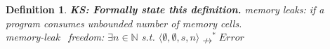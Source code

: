 \documentclass[english]{jssst_ppl} %
\newcommand\LET{\mathbf{let}\;}
\newcommand\FREE{\mathbf{free(x)}\;}
\newcommand\IN{\mathbf{in}\;}
\newcommand\Rtab{\; \; \; \;}
\newcommand\Lfc{\left\{}
\newcommand\Rfc{\right\}}
\newcommand\Lb{\left[}
\newcommand\Rb{\right]}
\newcommand\coma{,\;}
\newcommand\Malloc{\mathbf{malloc}}
\newcommand\Free{\mathbf{free}}
\newtheorem{myDef}{Definition}
\theoremstyle{definition}
\newcommand\todo[1]{{\bf KS: {#1}}}
\begin{document}
%
\begin{myDef}
\todo{Formally state this definition.}
memory leaks: if a program consumes unbounded number of memory cells.\\
memory-leak \ freedom: $\exists n \in \mathbb{N}$ s.t. $\langle \emptyset, \emptyset, s, n \rangle \nrightarrow^{*}Error$
\label{df:ml}
\end{myDef}
\end{document}
